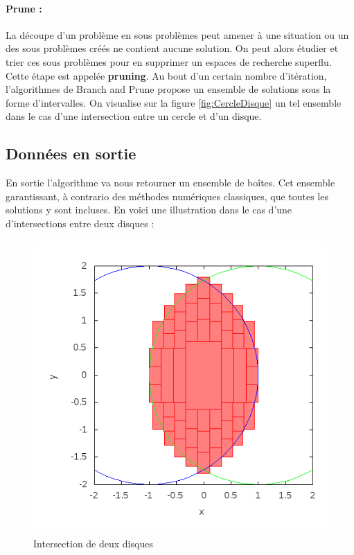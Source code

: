 \paragraph{Prune :}
La découpe d'un problème en sous problèmes peut amener à une situation ou un des sous problèmes créés ne contient aucune solution. On peut alors étudier et trier ces sous problèmes pour en supprimer un espaces de recherche superflu. Cette étape est appelée \textbf{pruning}.
Au bout d'un certain nombre d'itération, l'algorithmes de Branch and Prune propose un ensemble de solutions sous la forme d'intervalles. On visualise sur la figure \ref{fig:CercleDisque} un tel ensemble dans le cas d'une intersection entre un cercle et d'un disque.





\subsection{Données en sortie}
En sortie l'algorithme va nous retourner un ensemble de boîtes. Cet ensemble garantissant, à contrario des méthodes numériques classiques, que toutes les solutions y sont incluses. En voici une illustration dans le cas d'une d'intersections entre deux disques : 
\begin{figure}[h] %
  \center
\includegraphics[scale=0.50]{img/disk-disk}
  \caption{Intersection de deux disques} %
 \label{fig:DisqueDisque} %
\end{figure} %

